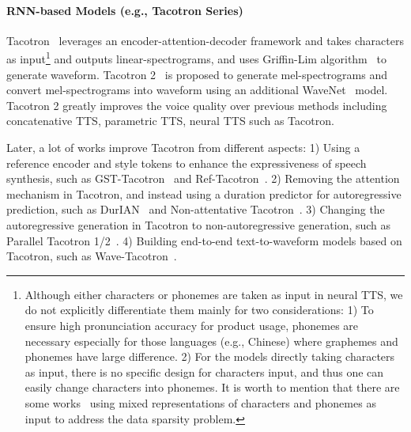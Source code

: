 \documentclass{article}
\begin{document}
\paragraph{RNN-based Models (e.g., Tacotron Series)}
Tacotron~\cite{wang2017tacotron} leverages an encoder-attention-decoder framework and takes characters as input\footnote{Although either characters or phonemes are taken as input in neural TTS, we do not explicitly differentiate them mainly for two considerations: 1) To ensure high pronunciation accuracy for product usage, phonemes are necessary especially for those languages (e.g., Chinese) where graphemes and phonemes have large difference. 2) For the models directly taking characters as input, there is no specific design for characters input, and thus one can easily change characters into phonemes. It is worth to mention that there are some works~\cite{ping2018deep,peng2020non,kastner2019representation} using mixed representations of characters and phonemes as input to address the data sparsity problem.} and outputs linear-spectrograms, and uses Griffin-Lim algorithm~\cite{griffin1984signal} to generate waveform. Tacotron 2~\cite{shen2018natural} is proposed to generate mel-spectrograms and convert mel-spectrograms into waveform using an additional WaveNet~\cite{oord2016wavenet} model. Tacotron 2 greatly improves the voice quality over previous methods including concatenative TTS, parametric TTS, neural TTS such as Tacotron.

Later, a lot of works improve Tacotron from different aspects: 1) Using a reference encoder and style tokens to enhance the expressiveness of speech synthesis, such as GST-Tacotron~\cite{wang2018style} and Ref-Tacotron~\cite{skerry2018towards}. 2) Removing the attention mechanism in Tacotron, and instead using a duration predictor for autoregressive prediction, such as DurIAN~\cite{yu2020durian} and Non-attentative Tacotron~\cite{shen2020non}. 3) Changing the autoregressive generation in Tacotron to non-autoregressive generation, such as Parallel Tacotron 1/2~\cite{elias2020parallel,elias2021parallel}. 4) Building end-to-end text-to-waveform models based on Tacotron, such as Wave-Tacotron~\cite{weiss2020wave}. 
\end{document}
